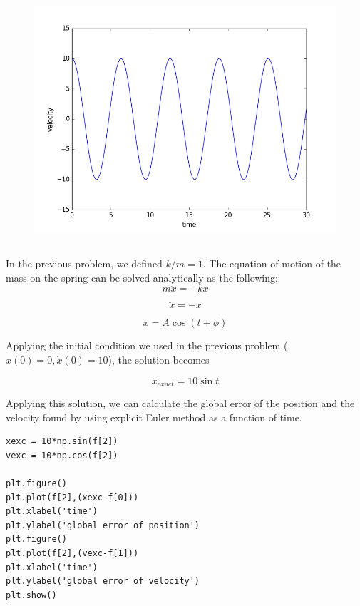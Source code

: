 \documentclass[10pt]{article}
\begin{document}
\begin{figure}[!h]
	\centering
	\includegraphics[scale=0.5]{w3fig2.png}
\end{figure}

\newpage

\subsection{}
In the previous problem, we defined $k/m =1$. The equation of motion of the mass on the spring can be solved analytically as the following:\\

$$
m\ddot x = -kx
$$

$$
\ddot x = -x
$$

$$
x = A \cos(t + \phi)
$$

Applying the initial condition we used in the previous problem ($x(0) = 0, \dot x(0) = 10$), the solution becomes

$$
x_{exact} = 10 \sin t 
$$

Applying this solution, we can calculate the global error of the position and the velocity found by using explicit Euler method as a function of time.  \\

\begin{lstlisting}
xexc = 10*np.sin(f[2])
vexc = 10*np.cos(f[2])

plt.figure()
plt.plot(f[2],(xexc-f[0]))
plt.xlabel('time')
plt.ylabel('global error of position')
plt.figure()
plt.plot(f[2],(vexc-f[1]))
plt.xlabel('time')
plt.ylabel('global error of velocity')
plt.show()
\end{lstlisting}
\end{document}
